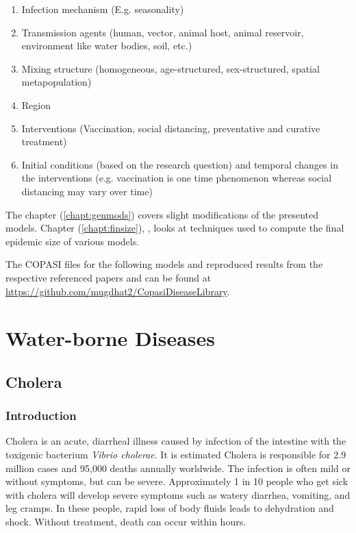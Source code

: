 \documentclass{book}
\begin{document}
\begin{enumerate}
    \item Infection mechanism (E.g. seasonality)
    \item Transmission agents (human, vector, animal host, animal reservoir, environment like water bodies, soil, etc.)
    \item Mixing structure (homogeneous, age-structured, sex-structured, spatial metapopulation)
    \item Region
    \item Interventions (Vaccination, social distancing, preventative and curative treatment)
    \item Initial conditions (based on the research question) and temporal changes in the interventions (e.g. vaccination is one time phenomenon whereas social distancing may vary over time)
\end{enumerate}

The  chapter (\ref{chapt:genmods}) covers slight modifications of the presented models. Chapter (\ref{chapt:finsize}), , looks at techniques used to compute the final epidemic size of various models. 


The COPASI files for the following models and reproduced results from the respective referenced papers and can be found at \url{https://github.com/mugdhat2/CopasiDiseaseLibrary}.


\chapter{Water-borne Diseases}
\label{chapt:waterborne}

\section{Cholera}
\subsection*{Introduction}
Cholera is an acute, diarrheal illness caused by infection of the intestine with the toxigenic bacterium {\it Vibrio cholerae}. It is estimated Cholera is responsible for 2.9 million cases and 95,000 deaths annually worldwide. The infection is often mild or without symptoms, but can be severe. Approximately 1 in 10 people who get sick with cholera will develop severe symptoms such as watery diarrhea, vomiting, and leg cramps. In these people, rapid loss of body fluids leads to dehydration and shock. Without treatment, death can occur within hours.
\end{document}
